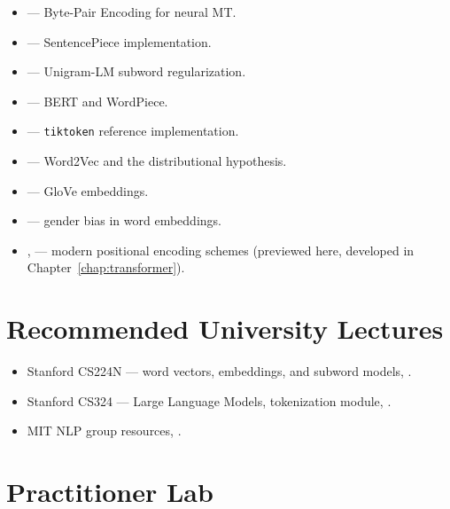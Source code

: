 \begin{itemize}
  \item \citet{sennrich2016bpe} --- Byte-Pair Encoding for neural MT.
  \item \citet{kudo2018sentencepiece} --- SentencePiece implementation.
  \item \citet{kudo2018unigram} --- Unigram-LM subword regularization.
  \item \citet{devlin2019bert} --- BERT and WordPiece.
  \item \citet{openai_tiktoken} --- \texttt{tiktoken} reference
        implementation.
  \item \citet{mikolov2013efficient,mikolov2013distributed} ---
        Word2Vec and the distributional hypothesis.
  \item \citet{pennington2014glove} --- GloVe embeddings.
  \item \citet{bolukbasi2016man} --- gender bias in word embeddings.
  \item \citet{su2021rope}, \citet{press2022alibi} --- modern
        positional encoding schemes (previewed here, developed in
        Chapter~\ref{chap:transformer}).
\end{itemize}

\section{Recommended University Lectures}

\begin{itemize}
  \item Stanford CS224N --- word vectors, embeddings, and subword
        models, \citet{stanford_cs224n}.
  \item Stanford CS324 --- Large Language Models, tokenization
        module, \citet{stanford_cs324}.
  \item MIT NLP group resources, \citet{mit_nlp}.
\end{itemize}

\section{Practitioner Lab}

